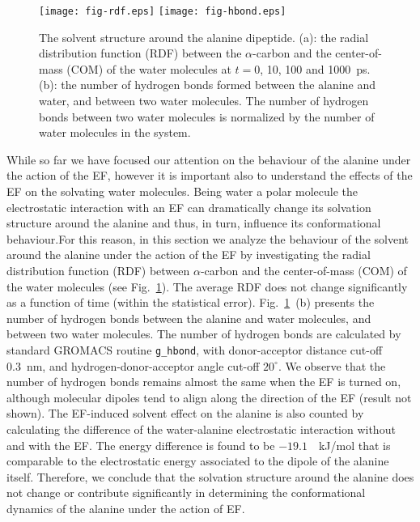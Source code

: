 \documentclass[a4paper,preprint,unsortedaddress,onecolumn]{revtex4-1}
\newcommand{\recheck}[1]{{\color{red} #1}}
\begin{document}
\begin{figure}
  \centering
  \texttt{[image: fig-rdf.eps]}
  \texttt{[image: fig-hbond.eps]}
  \caption{The solvent structure around the alanine dipeptide.  
    (a): the radial distribution function (RDF) between the
    $\alpha$-carbon and the center-of-mass (COM) of the water molecules at
    $t = 0$, 10, 100 and 1000~ps.  (b): the number of hydrogen
    bonds formed between the alanine and water, and between two water
    molecules.  The number of hydrogen bonds between two water
    molecules is normalized by the number of water molecules in the
    system. 
  }
  \label{fig:tmp7a}
\end{figure}
\recheck{While so far we have focused our attention on the behaviour of the alanine under the action of the EF, however it is important also to understand the effects of the EF on the solvating water molecules. Being water a polar molecule the electrostatic interaction with an EF can dramatically change its solvation structure around the alanine and thus, in turn, influence its conformational behaviour.For this reason, in this section we analyze the behaviour of the solvent around the alanine under the action of the EF by investigating}
the radial distribution function (RDF) between $\alpha$-carbon and the
center-of-mass (COM) of the water molecules
(see Fig.~\ref{fig:tmp7a}). The average
RDF does not change significantly as a function of time
(within the statistical error). 
Fig.~\ref{fig:tmp7a}~(b) presents the number of hydrogen bonds between the
alanine and water molecules, and between two water molecules.
\recheck{The number of hydrogen bonds are calculated by standard GROMACS
routine {\texttt {g\_hbond}}, with donor-acceptor distance cut-off 0.3~nm,
and hydrogen-donor-acceptor angle cut-off $20^{\circ}$.}
We observe that the
number of hydrogen bonds remains almost the same when the EF is turned on,
although molecular dipoles tend to align along the direction of the EF (result
not shown). 
The EF-induced solvent effect on the alanine is also counted by calculating the
difference of the water-alanine electrostatic interaction 
without and with the EF.
The energy difference is found to be $-19.1$~~kJ/mol that is
comparable to the electrostatic energy associated to the dipole of the alanine itself.
Therefore, we conclude that the solvation structure around the
alanine does not change or contribute significantly in determining the conformational dynamics of the alanine under the action of EF.
\end{document}
